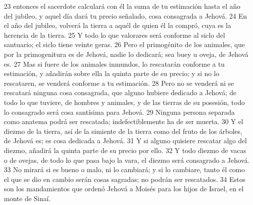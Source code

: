 23 entonces el sacerdote calculará con él la suma de tu estimación hasta el año del jubileo, y aquel día dará tu precio señalado, cosa consagrada a Jehová.
24 En el año del jubileo, volverá la tierra a aquél de quien él la compró, cuya es la herencia de la tierra.
25 Y todo lo que valorares será conforme al siclo   del santuario; el siclo tiene veinte geras.
26 Pero el primogénito de los animales, que por la primogenitura es de Jehová, nadie lo dedicará; sea buey u oveja, de Jehová es.
27 Mas si fuere de los animales inmundos, lo rescatarán conforme a tu estimación, y añadirán sobre ella la quinta parte de su precio; y si no lo rescataren, se venderá conforme a tu estimación.
28 Pero no se venderá ni se rescatará ninguna cosa consagrada, que alguno hubiere dedicado a Jehová; de todo lo que tuviere, de hombres y animales, y de las tierras de su posesión, todo lo consagrado será cosa santísima para Jehová.
29 Ninguna persona separada como anatema podrá ser rescatada; indefectiblemente ha de ser muerta.
30 Y el diezmo de la tierra, así de la simiente de la tierra como del fruto de los árboles, de Jehová es; es cosa dedicada a Jehová.
31 Y si alguno quisiere rescatar algo del diezmo, añadirá la quinta parte de su precio por ello.
32 Y todo diezmo de vacas o de ovejas, de todo lo que pasa bajo la vara, el diezmo será consagrado a Jehová.
33 No mirará si es bueno o malo, ni lo cambiará; y si lo cambiare, tanto él como el que se dio en cambio serán cosas sagradas; no podrán ser rescatados.
34 Estos son los mandamientos que ordenó Jehová a Moisés para los hijos de Israel, en el monte de Sinaí.


